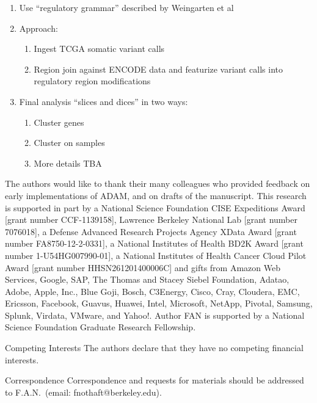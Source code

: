 \documentclass{nature}
\begin{document}
\begin{methods}
\begin{refsegment}
\begin{enumerate}
\item Use ``regulatory grammar'' described by Weingarten et al~\cite{weingarten14}
\item Approach:
\begin{enumerate}
\item Ingest TCGA somatic variant calls
\item Region join against ENCODE data and featurize variant calls into regulatory region
modifications
\end{enumerate}
\item Final analysis ``slices and dices'' in two ways:
\begin{enumerate}
\item Cluster genes
\item Cluster on samples
\item More details TBA
\end{enumerate}
\end{enumerate}

\printbibliography[segment=2]

\end{refsegment}
\end{methods}

\begin{addendum}
\item The authors would like to thank their many colleagues who provided feedback on early implementations of
ADAM, and on drafts of the manuscript. This research is supported in part by a National Science Foundation CISE Expeditions Award
[grant number CCF-1139158], Lawrence Berkeley National Lab [grant number 7076018], a Defense
Advanced Research Projects Agency XData Award [grant number FA8750-12-2-0331], a National
Institutes of Health BD2K Award [grant number 1-U54HG007990-01], a National Institutes of Health Cancer
Cloud Pilot Award [grant number HHSN261201400006C] and gifts from Amazon Web Services, Google,
SAP, The Thomas and Stacey Siebel Foundation, Adatao, Adobe, Apple, Inc., Blue Goji, Bosch, C3Energy,
Cisco, Cray, Cloudera, EMC, Ericsson, Facebook, Guavus, Huawei, Intel, Microsoft, NetApp, Pivotal,
Samsung, Splunk, Virdata, VMware, and Yahoo!. Author FAN is supported by a National Science
Foundation Graduate Research Fellowship.
\item[Competing Interests] The authors declare that they have no
competing financial interests.
\item[Correspondence] Correspondence and requests for materials should be addressed to
\linebreak F.A.N.~(email: fnothaft@berkeley.edu).
\end{addendum}
\end{document}
